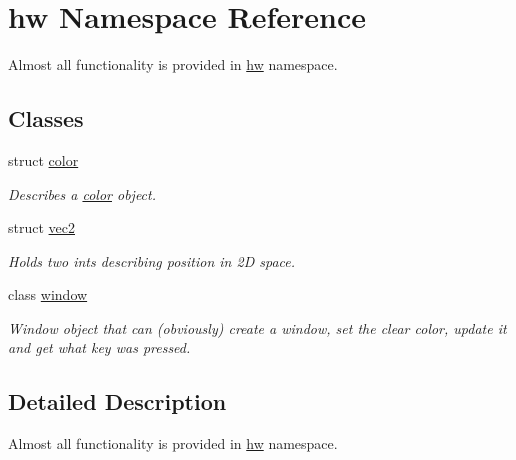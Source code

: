 \hypertarget{namespacehw}{}\section{hw Namespace Reference}
\label{namespacehw}


Almost all functionality is provided in \mbox{\hyperlink{namespacehw}{hw}} namespace.  


\subsection*{Classes}
\begin{DoxyCompactItemize}
\item 
struct \mbox{\hyperlink{structhw_1_1color}{color}}
\begin{DoxyCompactList}\small\item\em Describes a \mbox{\hyperlink{structhw_1_1color}{color}} object. \end{DoxyCompactList}\item 
struct \mbox{\hyperlink{structhw_1_1vec2}{vec2}}
\begin{DoxyCompactList}\small\item\em Holds two ints describing position in 2D space. \end{DoxyCompactList}\item 
class \mbox{\hyperlink{classhw_1_1window}{window}}
\begin{DoxyCompactList}\small\item\em Window object that can (obviously) create a window, set the clear color, update it and get what key was pressed. \end{DoxyCompactList}\end{DoxyCompactItemize}


\subsection{Detailed Description}
Almost all functionality is provided in \mbox{\hyperlink{namespacehw}{hw}} namespace. 